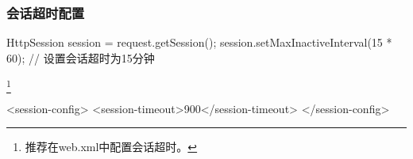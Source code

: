 
\begin{frame}[fragile] %
  \frametitle{会话超时配置} 


  \begin{javaCode}
    HttpSession session = request.getSession();
    session.setMaxInactiveInterval(15 * 60); // 设置会话超时为15分钟
  \end{javaCode}

  \footnote{推荐在web.xml中配置会话超时。}

  \begin{xmlCode}
    <session-config>
      <session-timeout>900</session-timeout>
    </session-config>
  \end{xmlCode}
\end{frame}


